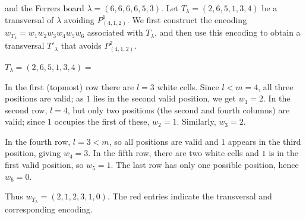 \documentclass[12pt, english, a4paper]{article}
\theoremstyle{plain}
\theoremstyle{definition}
\theoremstyle{remark}
\begin{document}
and the Ferrers board 
$\lambda=(6,6,6,6,5,3)$. Let $T_{\lambda}=(2,6,5,1,3,4)$ be a transversal of $\lambda$ 
avoiding $P^1_{(4,1,2)}$. We first construct the encoding 
$w_{T_{\lambda}}=w_1w_2w_3w_4w_5w_6$ associated with $T_{\lambda}$, and then use this encoding to obtain a transversal $T'_{\lambda}$ that avoids $P^2_{(4,1,2)}$.

$T_{\lambda}=(2,6,5,1,3,4)=$ 

\vspace{0.2cm}

In the first (topmost) row there are $l=3$ white cells. Since $l<m=4$, all 
three positions are valid; as $1$ lies in the second valid position, we get 
$w_1=2$. In the second row, $l=4$, but only two positions (the second and 
fourth columns) are valid; since $1$ occupies the first of these, $w_2=1$. 
Similarly, $w_3=2$. 

In the fourth row, $l=3<m$, so all positions are valid and $1$ appears in 
the third position, giving $w_4=3$. In the fifth row, there are two white 
cells and $1$ is in the first valid position, so $w_5=1$. The last row has 
only one possible position, hence $w_6=0$. 

Thus $w_{T_{\lambda}}=(2,1,2,3,1,0)$. The red entries indicate the transversal and corresponding encoding.
\end{document}

